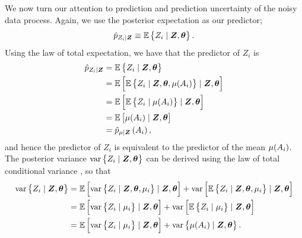 \documentclass[12pt,a4paper]{article}
\begin{document}
\begin{appendices}
We now turn our attention to prediction and prediction uncertainty of the noisy data process. 
Again, we use the posterior expectation as our predictor; 
\begin{equation}\label{eqn:04-03:ZOptimalPredictor}
    \hat{p}_{Z_i|\vec{Z}}
    \equiv 
    \ECurly{Z_i \mid \vec{Z}, \vec{\theta}}.
\end{equation}
Using the law of total expectation, 
we have that the predictor of $Z_i$ is
\begin{align*}
    \hat{p}_{Z_i|\vec{Z}}
    &=
    \ECurly{Z_i \mid \vec{Z}, \vec{\theta}}\\
    &=
    \ESquare{  \ECurly{Z_i \mid \vec{Z}, \vec{\theta}, \muZgivenY{A_i} }  \mid  \vec{Z}, \vec{\theta} }\\ 
    &=
    \ESquare{  \ECurly{Z_i \mid \muZgivenY{A_i}}  \mid  \vec{Z}, \vec{\theta} }\\
    &=
    \ESquare{  \muZgivenY{A_i}  \mid  \vec{Z}, \vec{\theta} }\\
    &=
    \pmugivenZ{A_i},
\end{align*}
and hence the predictor of $Z_i$ is equivalent to the predictor of the mean $\mu(A_i)$. 
The posterior variance $\varCurly{Z_i \mid \vec{Z}, \vec{\theta}}$ can be derived using the law of total conditional variance \citep[e.g.,][]{Bowsher_Swain_2012_total_conditional_variance}, 
so that
\begin{align}\label{eqn:var(Z|Z)}
    \varCurly{Z_i \mid \vec{Z}, \vec{\theta}}
    &=
    \ESquare{  \varCurly{  Z_i \mid \vec{Z}, \vec{\theta}, \mu_i    } \mid \vec{Z}, \vec{\theta}   } 
    + 
    \varSquare{  \ECurly{   Z_i \mid \vec{Z}, \vec{\theta}, \mu_i} \mid \vec{Z}, \vec{\theta}    }\nonumber\\
    &=
    \ESquare{   \varCurly{   Z_i \mid \mu_i   } \mid \vec{Z}, \vec{\theta}  } 
    + 
    \varSquare{ \ECurly{   Z_i \mid  \mu_i   } \mid \vec{Z}, \vec{\theta}}\nonumber\\
    &=
    \ESquare{   \varCurly{   Z_i \mid \mu_i   } \mid \vec{Z}, \vec{\theta}  } 
    + 
    \varCurly{ \muZgivenY{A_i} \mid \vec{Z}, \vec{\theta}}.

\end{align}
\end{appendices}
\end{document}
